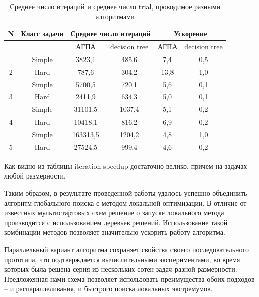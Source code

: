 \documentclass{svproc}
\begin{document}
\begin{table}[h!]
	\caption{Среднее число итераций и среднее число trial, проводимое разными алгоритмами}
	\label{tab:2}
	\centering
	\begin{tabular}{|c|c|c|c|c|c|}
		\hline
		
		N & Класс задачи & \multicolumn{2}{c|}{Среднее число итераций} & \multicolumn{2}{c|}{Ускорение} \\ \hline
		& ~ & АГПА & decision tree & АГПА & decision tree \\ \hline
		& Simple & 3823,1   & 485,6  & 7,4   & 0,5 \\ \hline
		2  & Hard & 787,6    & 304,2  & 13,8  & 1,0 \\ \hline
		& Simple & 5700,5   & 720,1  & 5,6   & 0,1 \\ \hline
		3  & Hard & 2411,9   & 634,3  & 5,0   & 0,1 \\ \hline
		& Simple & 31101,5  & 1037,4 & 5,1   & 0,2 \\ \hline
		4  & Hard & 10418,1  & 816,2  & 6,9   & 0,2 \\ \hline
		& Simple & 163313,5 & 1204,2 & 4,8   & 1,0 \\ \hline
		5  & Hard & 27524,5  & 999,4  & 4,6   & 0,2 \\ \hline
	\end{tabular}
\end{table}

Как видно из таблицы iteration speedup достаточно велико, причем на задачах любой размерности. 

Таким образом, в результате проведенной работы удалось успешно объединить алгоритм глобального поиска с методом локальной оптимизации. 
В отличие от известных мультистартовых схем решение о запуске локального метода производится с использованием деревьев решений.
Использование такой комбинации методов позволяет значительно ускорить работу алгоритма. 

Параллельный вариант алгоритма сохраняет свойства своего последовательного прототипа, что подтверждается вычислительными экспериментами, во время которых была решена серия из нескольких сотен задач разной размерности. Предложенная нами схема позволяет использовать преимущества обоих подходов -- и распараллеливания, и быстрого поиска локальных экстремумов.
\end{document}
